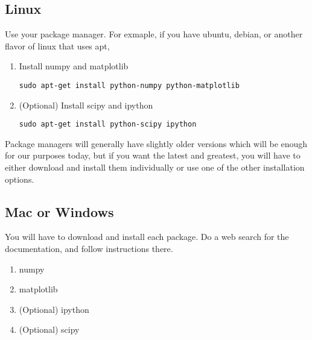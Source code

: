 \documentclass[11pt]{article}
\begin{document}
\subsection{Linux}
\label{sec-3-1}
Use your package manager. For exmaple, if you have ubuntu, debian, or another flavor of linux that uses apt,
\begin{enumerate}
\item Install numpy and matplotlib
\begin{verbatim}
sudo apt-get install python-numpy python-matplotlib
\end{verbatim}
\item (Optional) Install scipy and ipython
\begin{verbatim}
sudo apt-get install python-scipy ipython
\end{verbatim}
\end{enumerate}

Package managers will generally have slightly older versions which will be enough for our purposes today, but if you want the latest and greatest, you will have to either download and install them individually or use one of the other installation options.

\subsection{Mac or Windows}
\label{sec-3-2}
You will have to download and install each package. Do a web search for the documentation, and follow instructions there.
\begin{enumerate}
\item numpy
\item matplotlib
\item (Optional) ipython
\item (Optional) scipy
\end{enumerate}
\end{document}
